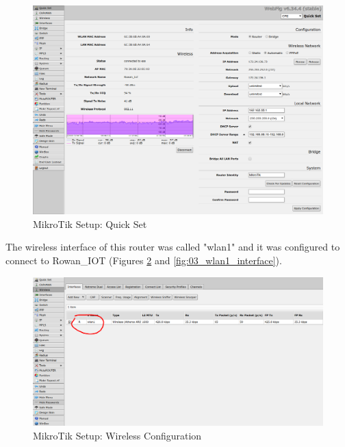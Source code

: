 \documentclass{article}
\begin{document}
\begin{figure}[H]
  \begin{center}
    \includegraphics[scale=0.30]{./img/mikrotik/01_quick_set.png}
  \end{center}
  \caption{MikroTik Setup: Quick Set}
  \label{fig:01_quick_set}
\end{figure}

The wireless interface of this router was called "wlan1" and it was configured
to connect to Rowan\_IOT (Figures \ref{fig:02_wireless} and
\ref{fig:03_wlan1_interface}).

\begin{figure}[H]
  \begin{center}
    \includegraphics[scale=0.30]{./img/mikrotik/02_wireless.png}
  \end{center}
  \caption{MikroTik Setup: Wireless Configuration}
  \label{fig:02_wireless}
\end{figure}
\end{document}
